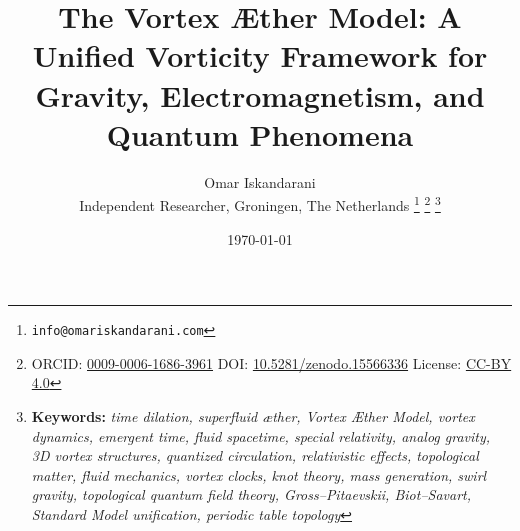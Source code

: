 \documentclass[a4paper,10pt]{article}
\begin{document}
    \title{The Vortex Æther Model: A Unified Vorticity Framework for Gravity, Electromagnetism, and Quantum Phenomena}
    \date{\today}
    \author{
        Omar Iskandarani\\
        \small Independent Researcher, Groningen, The Netherlands
        \thanks{\texttt{info@omariskandarani.com}}
        \thanks{ORCID: \href{https://orcid.org/0009-0006-1686-3961}{0009-0006-1686-3961} \quad DOI: \href{https://doi.org/10.5281/zenodo.15566336}{10.5281/zenodo.15566336} \quad License: \href{https://creativecommons.org/licenses/by/4.0/}{CC-BY 4.0}}
        \noindent\thanks{\textbf{Keywords:} \textit{time dilation, superfluid æther, Vortex Æther Model, vortex dynamics, emergent time, fluid spacetime, special relativity, analog gravity, 3D vortex structures, quantized circulation, relativistic effects, topological matter, fluid mechanics, vortex clocks, knot theory, mass generation, swirl gravity, topological quantum field theory, Gross--Pitaevskii, Biot--Savart, Standard Model unification, periodic table topology}}
    }
    \maketitle
\end{document}

